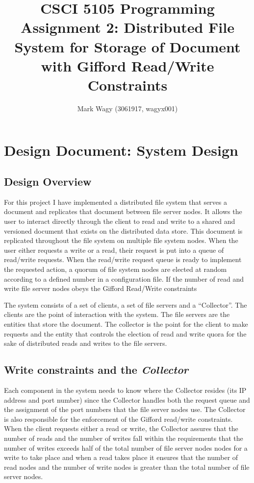 \documentclass
[english,a4paper]{article}
\begin{document}
\title{CSCI 5105 Programming Assignment 2: Distributed File System for Storage of Document with Gifford
  Read/Write Constraints}
\author{Mark Wagy (3061917, wagyx001)}

\maketitle

\newpage
\section{Design Document: System Design}

\subsection{Design Overview}
For this project I have implemented a distributed file system that
serves a document and replicates that document between file server
nodes. It allows the user to interact directly through the client to
read and write to a shared and 
versioned document that exists on the distributed data store. This
document is replicated throughout the file system on multiple file
system nodes. When the user either requests a write or a read, their
request is put into a queue of read/write requests. When the
read/write request queue is ready to implement the requested action,
a quorum of file system nodes are elected at random according to a
defined number in a configuration file. If the number of read and
write file server nodes obeys the Gifford Read/Write constraints \cite{gifford_weighted_1979}

The system consists of a set of clients, a set of file servers and a
``Collector''. The clients are the point of interaction with the
system. The file servers are the entities that store the document. The
collector is the point for the client to make requests and the entity
that controls the election of read and write quora for the sake of
distributed reads and writes to the file servers.

\subsection{Write constraints and the \emph{Collector}}
Each component in the system needs to know where the Collector resides
(its IP address and port number) since the Collector handles both the
request queue and the assignment of the port numbers that the file
server nodes use. The Collector is also responsible for the
enforcement of the Gifford read/write constraints. When the client
requests either a read or write, the Collector assures that the number
of reads and the number of writes fall within the requirements that
the number of writes exceeds half of the total number of file server
nodes nodes for a write to take place and when a read takes place it
ensures that the number of read nodes and the number of write nodes is
greater than the total number of file server nodes.
\end{document}
